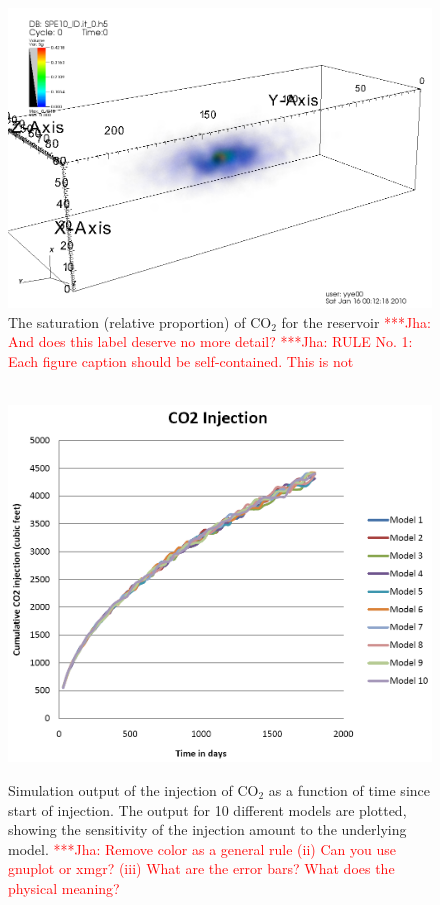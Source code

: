 \documentclass{acm_proc_article-sp}
\newcommand{\jhanote}[1]{ {\textcolor{red} { ***Jha: #1 }}}
\newcommand{\jhanote}[1]{}
\begin{document}
\begin{figure}
\begin{center}
\includegraphics[scale=0.2]{figures/visit0001.png} 
\end{center}
\caption[Simulation Output]{The saturation (relative proportion) of
  CO$_2$ for the reservoir \jhanote{And does this label deserve no
    more detail?} \jhanote{RULE No. 1: Each figure caption should be
    self-contained. This is not} }
\label{fig:saturation}
\end{figure}

\begin{figure}
\begin{center}\
\includegraphics[scale=0.33]{figures/co2seq.png}
\end{center}
\caption[Simulation Output]{Simulation output of the injection of
  CO$_2$ as a function of time since start of injection. The output
  for 10 different models are plotted, showing the sensitivity of the
  injection amount to the underlying model. \jhanote{Remove color as a
    general rule (ii) Can you use gnuplot or xmgr? (iii) What are the
    error bars? What does the physical meaning?}}
\label{fig:carbon}
\end{figure}
\end{document}

